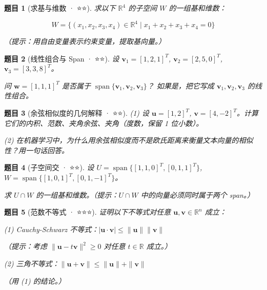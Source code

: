 \documentclass[12pt]{ctexart}
\newtheorem{problem}{题目}
\begin{document}
\begin{problem}[求基与维数 · ⭐⭐]
求以下 $\mathbb{R}^4$ 的子空间 $W$ 的一组基和维数：

\[
W = \{(x_1, x_2, x_3, x_4) \in \mathbb{R}^4 \mid x_1 + x_2 + x_3 + x_4 = 0\}
\]

（提示：用自由变量表示约束变量，提取基向量。）
\end{problem}




\begin{problem}[线性组合与 Span · ⭐⭐]
设 $\mathbf{v}_1 = [1, 2, 1]^T$, $\mathbf{v}_2 = [2, 5, 0]^T$, $\mathbf{v}_3 = [3, 3, 8]^T$。

问 $\mathbf{w} = [1, 1, 1]^T$ 是否属于 $\operatorname{span}\{\mathbf{v}_1, \mathbf{v}_2, \mathbf{v}_3\}$？
如果是，把它写成 $\mathbf{v}_1, \mathbf{v}_2, \mathbf{v}_3$ 的线性组合。
\end{problem}




\begin{problem}[余弦相似度的几何解释 · ⭐⭐]
(1) 设 $\mathbf{u} = [1, 2]^T$, $\mathbf{v} = [4, -2]^T$。计算它们的内积、范数、夹角余弦、夹角（度数，保留 1 位小数）。

(2) 在机器学习中，为什么用余弦相似度而不是欧氏距离来衡量文本向量的相似性？用一句话回答。

\end{problem}







\begin{problem}[子空间交 · ⭐⭐]
设 $U = \operatorname{span}\{[1, 1, 0]^T, [0, 1, 1]^T\}$, $W = \operatorname{span}\{[1, 0, 1]^T, [0, 1, -1]^T\}$。

求 $U \cap W$ 的一组基和维数。（提示：$U \cap W$ 中的向量必须同时属于两个 span。）
\end{problem}




\begin{problem}[范数不等式 · ⭐⭐⭐]
证明以下不等式对任意 $\mathbf{u}, \mathbf{v} \in \mathbb{R}^n$ 成立：

(1) Cauchy-Schwarz 不等式：$|\mathbf{u} \cdot \mathbf{v}| \leq \|\mathbf{u}\| \|\mathbf{v}\|$

（提示：考虑 $\|\mathbf{u} - t\mathbf{v}\|^2 \geq 0$ 对任意 $t \in \mathbb{R}$ 成立。）

(2) 三角不等式：$\|\mathbf{u} + \mathbf{v}\| \leq \|\mathbf{u}\| + \|\mathbf{v}\|$

（用 (1) 的结论。）
\end{problem}
\end{document}
